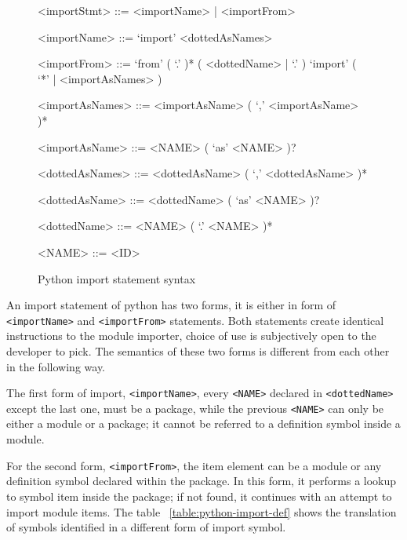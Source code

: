 \begin{figure}[ht]
    \begin{framed}
        \begin{grammar}
            <importStmt>
            ::= <importName>
            | <importFrom>

            <importName>
            ::= `import' <dottedAsNames>

            <importFrom>
            ::= `from' ( `.' )* ( <dottedName> | `.' ) `import' ( `*' | <importAsNames> )

            <importAsNames>
            ::= <importAsName> ( `,' <importAsName> )*

            <importAsName>
            ::= <NAME> ( `as' <NAME> )?

            <dottedAsNames>
            ::= <dottedAsName> ( `,' <dottedAsName> )*

            <dottedAsName>
            ::= <dottedName> ( `as' <NAME> )?

            <dottedName>
            ::= <NAME> ( `.' <NAME> )*

            <NAME> ::= <ID>
        \end{grammar}
    \end{framed}
    \caption{Python import statement syntax }
    \label{fig:python-import-stmt-syntax}
\end{figure}

An import statement of python has two forms, it is either in form of \texttt{<importName>} and \texttt{<importFrom>} statements. Both statements create identical instructions to the module importer, choice of use is subjectively open to the developer to pick. The semantics of these two forms is different from each other in the following way.

The first form of import, \texttt{<importName>}, every \texttt{<NAME>} declared in \texttt{<dottedName>} except the last one, must be a package, while the previous \texttt{<NAME>} can only be either a module or a package; it cannot be referred to a definition symbol inside a module.

For the second form, \texttt{<importFrom>}, the item element can be a module or any definition symbol declared within the package. In this form, it performs a lookup to symbol item inside the package; if not found, it continues with an attempt to import module items. The table ~\ref{table:python-import-def} shows the translation of symbols identified in a different form of import symbol.


